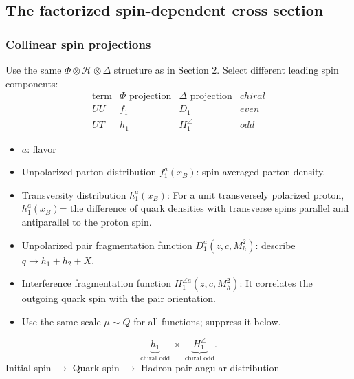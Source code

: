 \documentclass[14pt,a4paper]{extarticle}
\numberwithin{equation}{section}
\begin{document}
\subsection{The factorized spin-dependent cross section}
\subsubsection{Collinear spin projections}

Use the same $\Phi\otimes\mathcal H\otimes\Delta$ structure as in Section 2.
Select different leading spin components:
\begin{equation}
 \begin{array}{c|c|c|c}
  \text{term}&\Phi\text{ projection}&\Delta\text{ projection}&chiral\\\hline
  UU&f_1&D_1&even\\
  UT&h_1&H_1^{\angle}&odd
 \end{array}
\end{equation}
\begin{itemize}
 \item $a$: flavor 
 \item Unpolarized parton distribution $f_1^a(x_B)$:  spin-averaged parton density.
 \item Transversity distribution $h_1^a(x_B)$: For a unit transversely polarized
 proton, $h_1^a(x_B)$= the difference of quark densities with transverse spins
 parallel and antiparallel to the proton spin.
 \item Unpolarized pair fragmentation function $D_1^a(z,c,M_h^2)$: describe $q \to h_1+h_2+X$.
 \item Interference fragmentation function $H_1^{\angle a}(z,c,M_h^2)$: 
 It correlates the outgoing quark spin with the pair orientation.
 \item Use the same scale $\mu\sim Q$ for all functions; suppress it below.
\end{itemize}
\begin{equation}
 \underbrace{h_1}_{\text{chiral odd}}
 \ \times\ \underbrace{H_1^{\angle}}_{\text{chiral odd}}.
\end{equation}
Initial spin $\to$ Quark spin $\to$ Hadron-pair angular distribution  
\end{document}
